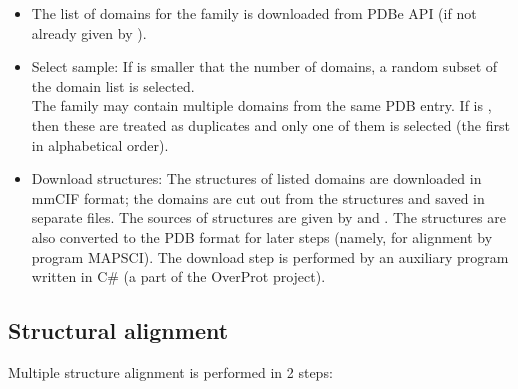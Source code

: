 \documentclass{article}
\begin{document}
\begin{itemize}
  \item
    The list of domains for the family is downloaded from PDBe API
    (if not already given by ).
  \item
    Select sample: If  is smaller that the number of domains, 
    a random subset of the domain list is selected.\\
    The family may contain multiple domains from the same PDB entry. If 
     is , 
    then these are treated as duplicates and only one of them is selected 
    (the first in alphabetical order).
  \item
    Download structures: The structures of listed domains are downloaded
    in mmCIF format; the domains are cut out from the structures and saved in
    separate files. The sources of structures are given by
     and
    . The structures are also converted 
    to the PDB format for later steps (namely, for alignment by program MAPSCI). 
    The download step is performed by an auxiliary program  
    written in C\# (a part of the OverProt project).
  \end{itemize}


  
\subsection{Structural alignment}

Multiple structure alignment is performed in 2 steps:
\end{document}
